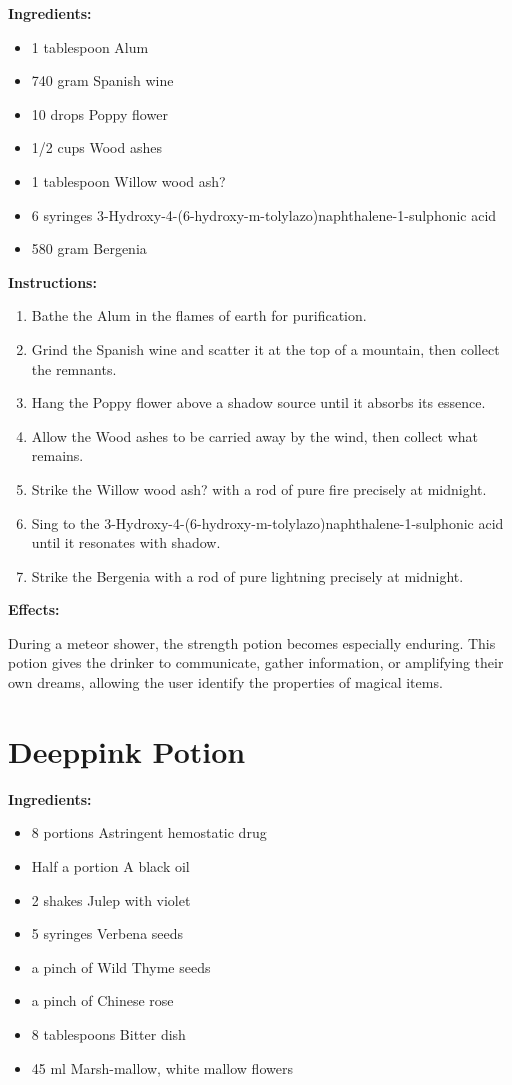 \documentclass{article}
\begin{document}
\textbf{Ingredients:}

\begin{itemize}
  \item 1 tablespoon Alum
  \item 740 gram Spanish wine
  \item 10 drops Poppy flower
  \item 1/2 cups Wood ashes
  \item 1 tablespoon Willow wood ash?
  \item 6 syringes 3-Hydroxy-4-(6-hydroxy-m-tolylazo)naphthalene-1-sulphonic acid
  \item 580 gram Bergenia
\end{itemize}

\textbf{Instructions:}

\begin{enumerate}
  \item Bathe the Alum in the flames of earth for purification.
  \item Grind the Spanish wine and scatter it at the top of a mountain, then collect the remnants.
  \item Hang the Poppy flower above a shadow source until it absorbs its essence.
  \item Allow the Wood ashes to be carried away by the wind, then collect what remains.
  \item Strike the Willow wood ash? with a rod of pure fire precisely at midnight.
  \item Sing to the 3-Hydroxy-4-(6-hydroxy-m-tolylazo)naphthalene-1-sulphonic acid until it resonates with shadow.
  \item Strike the Bergenia with a rod of pure lightning precisely at midnight.
\end{enumerate}

\textbf{Effects:}

During a meteor shower, the strength potion becomes especially enduring. This potion gives the drinker to communicate, gather information, or amplifying their own dreams, allowing the user identify the properties of magical items.

\newpage
\section*{Deeppink Potion}

\textbf{Ingredients:}

\begin{itemize}
  \item 8 portions Astringent hemostatic drug
  \item Half a portion A black oil
  \item 2 shakes Julep with violet
  \item 5 syringes Verbena seeds
  \item a pinch of Wild Thyme seeds
  \item a pinch of Chinese rose
  \item 8 tablespoons Bitter dish
  \item 45 ml Marsh-mallow, white mallow flowers
\end{itemize}
\end{document}
